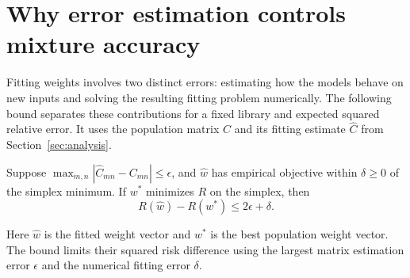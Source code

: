\section{Why error estimation controls mixture accuracy}
\label{app:proof}
Fitting weights involves two distinct errors: estimating how the models behave
on new inputs and solving the resulting fitting problem numerically.
The following bound separates these contributions for a fixed library and
expected squared relative error. It uses the population matrix $C$ and its
fitting estimate $\widehat C$ from Section~\ref{sec:analysis}.

\begin{proposition}
\label{prop:bound}
Suppose $\max_{m,n}|\widehat C_{mn}-C_{mn}|\leq\epsilon$, and $\widehat w$ has empirical
objective within $\delta\geq0$ of the simplex minimum. If $w^*$ minimizes $R$ on the simplex, then
\begin{equation}
 R(\widehat w)-R(w^*)\leq 2\epsilon+\delta.
 \label{eq:bound}
\end{equation}
\end{proposition}
Here $\widehat w$ is the fitted weight vector and $w^*$ is the best population
weight vector. The bound limits their squared risk difference using the largest
matrix estimation error $\epsilon$ and the numerical fitting error $\delta$.

